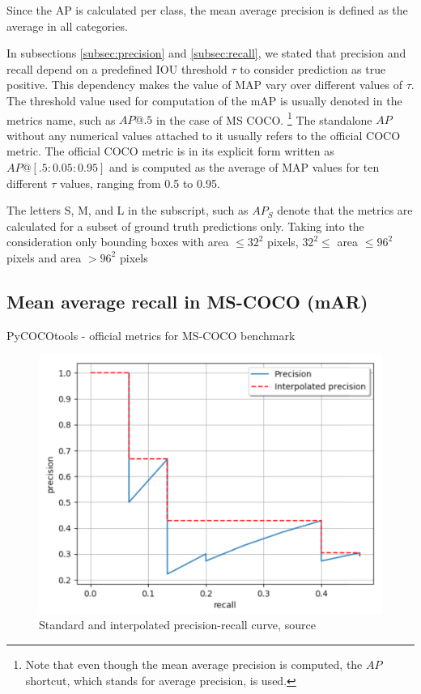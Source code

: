 Since the AP is calculated per class, the mean average precision is defined as the average  in all categories.

In subsections \ref{subsec:precision} and \ref{subsec:recall}, we stated that precision and recall depend on a predefined IOU threshold $\tau$ to consider prediction as true positive. This dependency makes the value of MAP vary over different values of $\tau$. The threshold value used for computation of the mAP is usually denoted in the metrics name, such as $AP@.5$ in the case of MS COCO. \footnote{Note that even though the mean average precision is computed, the $AP$ shortcut, which stands for average precision, is used.} The standalone $AP$ without any numerical values attached to it usually refers to the official COCO metric. The official COCO metric is in its explicit form written as $AP@[.5:0.05:0.95]$ and is computed as the average of MAP values for ten different $\tau$ values, ranging from 0.5 to 0.95.

The letters S, M,  and L in the subscript, such as $AP_S$ denote that the metrics are calculated for a subset of ground truth predictions only. Taking into the consideration only bounding boxes with area $\leq 32^2$ pixels, $32^2 \le $ area $ \leq 96^2$ pixels and area $> 96^2$ pixels

\subsection{Mean average recall in MS-COCO (mAR)}
PyCOCOtools - official metrics for MS-COCO benchmark \cite{}

\begin{figure}
    \includegraphics[width = 0.78\linewidth]{images/PR-curve.png}
    \caption{Standard and interpolated precision-recall curve, source \cite{Padilla2020}}
    \label{fig:pr_curve}
\end{figure}


